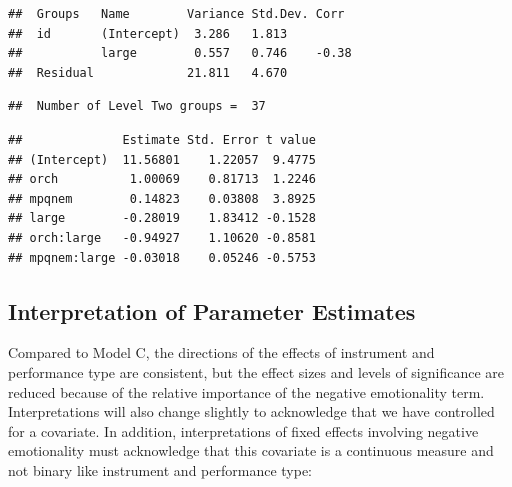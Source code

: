 \documentclass[
]{krantz}
\begin{document}
\begin{verbatim}
##  Groups   Name        Variance Std.Dev. Corr 
##  id       (Intercept)  3.286   1.813         
##           large        0.557   0.746    -0.38
##  Residual             21.811   4.670
\end{verbatim}

\begin{verbatim}
##  Number of Level Two groups =  37
\end{verbatim}

\begin{verbatim}
##              Estimate Std. Error t value
## (Intercept)  11.56801    1.22057  9.4775
## orch          1.00069    0.81713  1.2246
## mpqnem        0.14823    0.03808  3.8925
## large        -0.28019    1.83412 -0.1528
## orch:large   -0.94927    1.10620 -0.8581
## mpqnem:large -0.03018    0.05246 -0.5753
\end{verbatim}

\hypertarget{interp:modeld}{%
\subsection{Interpretation of Parameter Estimates}\label{interp:modeld}}

Compared to Model C, the directions of the effects of instrument and performance type are consistent, but the effect sizes and levels of significance are reduced because of the relative importance of the negative emotionality term. Interpretations will also change slightly to acknowledge that we have controlled for a covariate. In addition, interpretations of fixed effects involving negative emotionality must acknowledge that this covariate is a continuous measure and not binary like instrument and performance type:
\end{document}
